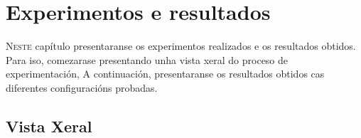 \chapter{Experimentos e resultados}
\label{chap:Experimentos e resultados}
\lettrine{N}{este} capítulo presentaranse os experimentos realizados e os resultados obtidos.
Para iso, comezarase presentando unha vista xeral do proceso de experimentación, 
A continuación, presentaranse os resultados obtidos cas diferentes configuracións probadas.

\section{Vista Xeral}
\label{sec:Vista Xeral}
  